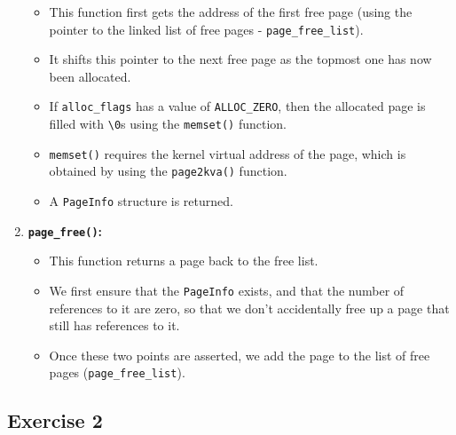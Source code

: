 \documentclass[]{article}
\begin{document}
\begin{enumerate}
  \begin{itemize}
  \itemsep1pt\parskip0pt
  \item
    This function first gets the address of the first free page (using
    the pointer to the linked list of free pages -
    \texttt{page\_free\_list}).
  \item
    It shifts this pointer to the next free page as the topmost one has
    now been allocated.
  \item
    If \texttt{alloc\_flags} has a value of \texttt{ALLOC\_ZERO}, then
    the allocated page is filled with \texttt{\textbackslash{}0}s using
    the \texttt{memset()} function.
  \item
    \texttt{memset()} requires the kernel virtual address of the page,
    which is obtained by using the \texttt{page2kva()} function.
  \item
    A \texttt{PageInfo} structure is returned.
  \end{itemize}
\item
  \textbf{\texttt{page\_free()}:}

  \begin{itemize}
  \itemsep1pt\parskip0pt
  \item
    This function returns a page back to the free list.
  \item
    We first ensure that the \texttt{PageInfo} exists, and that the
    number of references to it are zero, so that we don't accidentally
    free up a page that still has references to it.
  \item
    Once these two points are asserted, we add the page to the list of
    free pages (\texttt{page\_free\_list}).
  \end{itemize}
\end{enumerate}

\subsection{Exercise 2}
\end{document}
